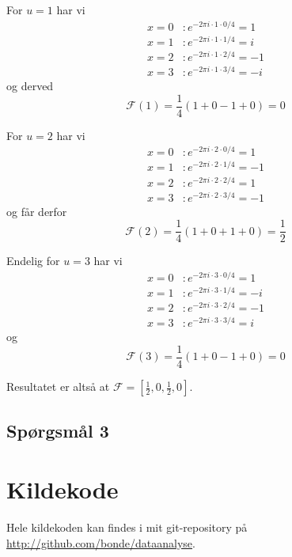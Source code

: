 \documentclass[a4paper, 10pt, danish, final]{article}
\def\repository{\url{http://github.com/bonde/dataanalyse}}
\begin{document}
For $u = 1$ har vi
\begin{align}
    x = 0 & : e^{-2\pi i \cdot 1 \cdot 0/4} = 1\\
    x = 1 & : e^{-2\pi i \cdot 1 \cdot 1/4} = i\\
    x = 2 & : e^{-2\pi i \cdot 1 \cdot 2/4} = -1\\
    x = 3 & : e^{-2\pi i \cdot 1 \cdot 3/4} = -i
\end{align}
og derved
\begin{equation}
    \mathcal{F}(1) = \frac{1}{4}(1 + 0 - 1 + 0) = 0
\end{equation}

For $u = 2$ har vi
\begin{align}
    x = 0 & : e^{-2\pi i \cdot 2 \cdot 0/4} = 1\\
    x = 1 & : e^{-2\pi i \cdot 2 \cdot 1/4} = -1\\
    x = 2 & : e^{-2\pi i \cdot 2 \cdot 2/4} = 1\\
    x = 3 & : e^{-2\pi i \cdot 2 \cdot 3/4} = -1
\end{align}
og får derfor
\begin{equation}
    \mathcal{F}(2) = \frac{1}{4}(1 + 0 + 1 + 0) = \frac{1}{2}
\end{equation}

Endelig for $u = 3$ har vi
\begin{align}
    x = 0 & : e^{-2\pi i \cdot 3 \cdot 0/4} = 1\\
    x = 1 & : e^{-2\pi i \cdot 3 \cdot 1/4} = -i\\
    x = 2 & : e^{-2\pi i \cdot 3 \cdot 2/4} = -1\\
    x = 3 & : e^{-2\pi i \cdot 3 \cdot 3/4} = i
\end{align}
og
\begin{equation}
    \mathcal{F}(3) = \frac{1}{4}(1 + 0 - 1 + 0) = 0
\end{equation}

Resultatet er altså at $\mathcal{F} = [\frac{1}{2}, 0,
\frac{1}{2}, 0]$.

\subsection*{Spørgsmål 3}






\appendix
\lstset{language=Matlab, basicstyle=\scriptsize,
    showstringspaces=false, numbers=left, stepnumber=1,
    numberstyle=\tiny, frame=none}
\section{Kildekode}
Hele kildekoden kan findes i mit git-repository på \repository{}.

%
\end{document}
